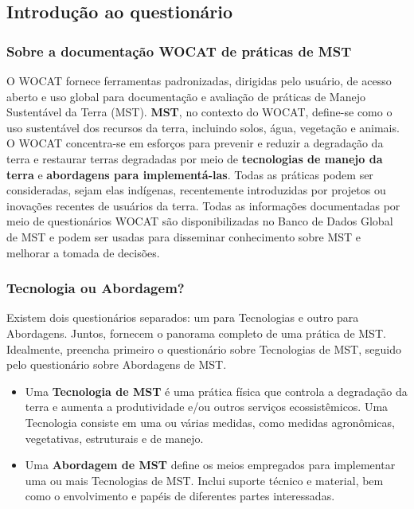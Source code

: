\subsection{Introdução ao questionário}\label{introduuxe7uxe3o-ao-questionuxe1rio}

\subsubsection{Sobre a documentação WOCAT de práticas de MST}\label{sobre-a-documentauxe7uxe3o-wocat-de-pruxe1ticas-de-mst}

O WOCAT fornece ferramentas padronizadas, dirigidas pelo usuário, de acesso aberto e uso global para documentação e avaliação de práticas de Manejo Sustentável da Terra (MST). \textbf{MST}, no contexto do WOCAT, define-se como o uso sustentável dos recursos da terra, incluindo solos, água, vegetação e animais. O WOCAT concentra-se em esforços para prevenir e reduzir a degradação da terra e restaurar terras degradadas por meio de \textbf{tecnologias de manejo da terra} e \textbf{abordagens para implementá-las}. Todas as práticas podem ser consideradas, sejam elas indígenas, recentemente introduzidas por projetos ou inovações recentes de usuários da terra. Todas as informações documentadas por meio de questionários WOCAT são disponibilizadas no Banco de Dados Global de MST e podem ser usadas para disseminar conhecimento sobre MST e melhorar a tomada de decisões.

\subsubsection{Tecnologia ou Abordagem?}\label{tecnologia-ou-abordagem}

Existem dois questionários separados: um para Tecnologias e outro para Abordagens. Juntos, fornecem o panorama completo de uma prática de MST. Idealmente, preencha primeiro o questionário sobre Tecnologias de MST, seguido pelo questionário sobre Abordagens de MST.

\begin{itemize}
\item
  Uma \textbf{Tecnologia de MST} é uma prática física que controla a degradação da terra e aumenta a produtividade e/ou outros serviços ecossistêmicos. Uma Tecnologia consiste em uma ou várias medidas, como medidas agronômicas, vegetativas, estruturais e de manejo.
\item
  Uma \textbf{Abordagem de MST} define os meios empregados para implementar uma ou mais Tecnologias de MST. Inclui suporte técnico e material, bem como o envolvimento e papéis de diferentes partes interessadas.
\end{itemize}

